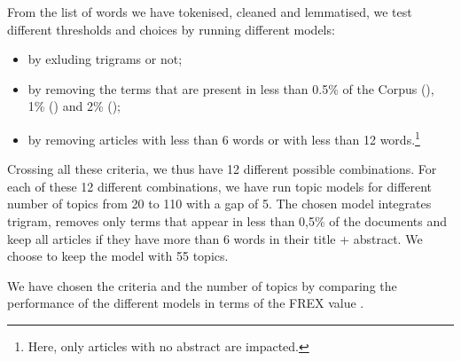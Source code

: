 \documentclass[]{elsarticle} %
\providecommand{\tightlist}{%
  \setlength{\itemsep}{0pt}\setlength{\parskip}{0pt}}
\begin{document}
From the list of words we have tokenised, cleaned and lemmatised, we
test different thresholds and choices by running different models:

\begin{itemize}
\tightlist
\item
  by exluding trigrams or not;
\item
  by removing the terms that are present in less than 0.5\% of the
  Corpus (), 1\% () and 2\% ();
\item
  by removing articles with less than 6 words or with less than 12
  words.\footnote{Here, only articles with no abstract are impacted.}
\end{itemize}

Crossing all these criteria, we thus have 12 different possible
combinations. For each of these 12 different combinations, we have run
topic models for different number of topics from 20 to 110 with a gap of
5. The chosen model integrates trigram, removes only terms that appear
in less than 0,5\% of the documents and keep all articles if they have
more than 6 words in their title + abstract. We choose to keep the model
with 55 topics.

We have chosen the criteria and the number of topics by comparing the
performance of the different models in terms of the FREX value
\citep{bischof2012}.


\end{document}
